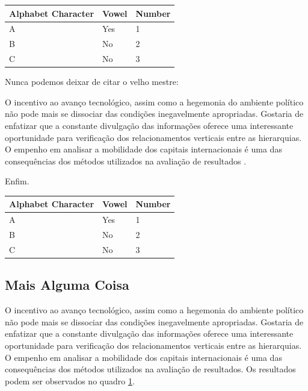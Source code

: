 \documentclass[font=plain,chapter=TITLE,section=Title,espaco=duplo,tocpage=plain,appendix=Name,floatnumber=continuous]{abnt}
\begin{document}
%
%
\begin{table}[h!b!p!]
\centering
\begin{tabular}{lll} %
\hline %
Alphabet Character & Vowel & Number \\ %
\hline
A & Yes & 1 \\ %
B & No & 2 \\
C & No & 3 \\
\hline
\end{tabular}
\label{quadro:outrola}
\end{table}

Nunca podemos deixar de citar o velho mestre:

\begin{citacao}
O incentivo ao avanço tecnológico, assim como a hegemonia do ambiente
político não pode mais se dissociar das condições inegavelmente
apropriadas. Gostaria de enfatizar que a constante divulgação das
informações oferece uma interessante oportunidade para verificação dos
relacionamentos verticais entre as hierarquias. O empenho em analisar a
mobilidade dos capitais internacionais é uma das consequências dos métodos
utilizados na avaliação de resultados \cite{semolini2002support}.
\end{citacao}

Enfim.

\begin{table}
\centering
\begin{tabular}{lll}
\hline
Alphabet Character & Vowel & Number \\
\hline
A & Yes & 1 \\
B & No & 2 \\
C & No & 3 \\
\hline
\end{tabular}
\end{table}

\subsection{Mais Alguma Coisa}

O incentivo ao avanço tecnológico, assim como a hegemonia do ambiente político
não pode mais se dissociar das condições inegavelmente apropriadas. Gostaria de
enfatizar que a constante divulgação das informações oferece uma interessante
oportunidade para verificação dos relacionamentos verticais entre as
hierarquias. O empenho em analisar a mobilidade dos capitais internacionais é
uma das consequências dos métodos utilizados na avaliação de resultados. Os
resultados podem ser observados no quadro \ref{quadro:outrola}.
\end{document}
